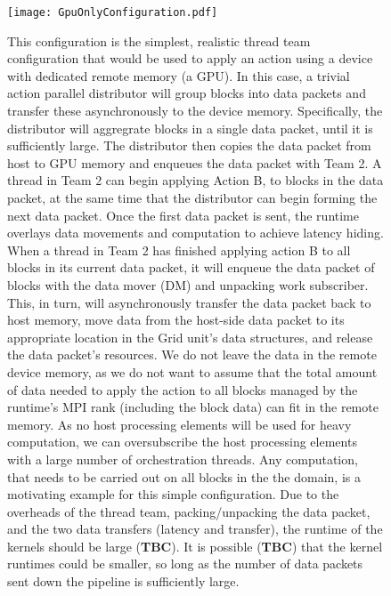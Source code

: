 \documentclass{article}
\begin{document}
\begin{appendices}
\begin{figure}[!ht]
\begin{center}
\texttt{[image: GpuOnlyConfiguration.pdf]}
\caption[]{This configuration is the simplest, realistic thread team
configuration that would be used to apply an action using a device with
dedicated remote memory (\eg a GPU).  In this case, a trivial action parallel
distributor will group blocks into data packets and transfer these
asynchronously to the device memory.  Specifically, the distributor will
aggregrate blocks in a single data packet, until it is sufficiently large.  The
distributor then copies the data packet from host to GPU memory and
enqueues the data packet with Team 2.  A thread in Team 2 can begin
applying Action B, to blocks in the data packet, at the same time that the
distributor can begin forming the next data packet.  Once the first
data packet is sent, the runtime overlays data movements and computation to
achieve latency hiding.  When a thread in Team 2 has finished applying action B
to all blocks in its current data packet, it will enqueue the data packet of
blocks with the data mover (DM) and unpacking work subscriber.  This, in turn,
will asynchronously transfer the data packet back to host memory, move
data from the host-side data packet to its appropriate location in the Grid unit's data structures, and
release the data packet's resources.  We do not
leave the data in the remote device memory, as we do not want to assume that the
total amount of data needed to apply the action to all blocks managed by the
runtime's MPI rank (including the block data) can fit in the remote memory.  As
no host processing elements will be used for heavy computation, we can
oversubscribe the host processing elements with a large number of orchestration
threads.  Any computation, that needs to be carried out on all blocks in the the
domain, is a motivating example for this simple configuration.  Due to
the overheads of the thread team, packing/unpacking the data packet, and the two
data transfers (latency and transfer), the runtime of the kernels should be
large (\textbf{TBC}).  It is possible (\textbf{TBC}) that
the kernel runtimes could be smaller, so long as the number of data packets sent
down the pipeline is sufficiently large.}
\label{fig:GpuOnlyConfig}
\end{center}
\end{figure}


\end{appendices}
\end{document}
